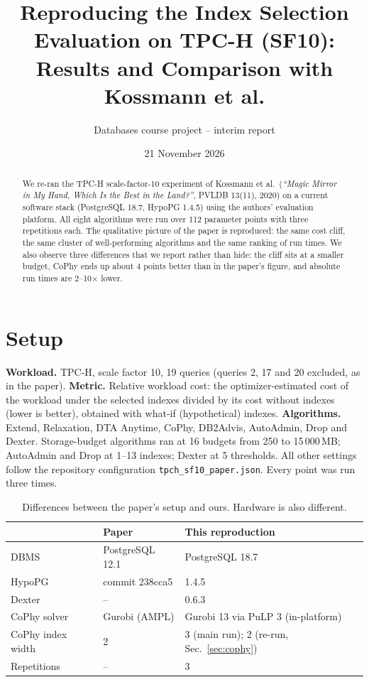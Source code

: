 \documentclass[11pt,a4paper]{article}
\title{Reproducing the Index Selection Evaluation on TPC-H (SF10):\\ Results and Comparison with Kossmann et al.}
\author{Databases course project -- interim report}
\date{21 November 2026}
\begin{document}
\maketitle

\begin{abstract}
We re-ran the TPC-H scale-factor-10 experiment of Kossmann et al.\ (\emph{``Magic Mirror in My Hand, Which Is the Best in the Land?''}, PVLDB 13(11), 2020) on a current software stack (PostgreSQL 18.7, HypoPG 1.4.5) using the authors' evaluation platform. All eight algorithms were run over 112 parameter points with three repetitions each. The qualitative picture of the paper is reproduced: the same cost cliff, the same cluster of well-performing algorithms and the same ranking of run times. We also observe three differences that we report rather than hide: the cliff sits at a smaller budget, CoPhy ends up about 4 points better than in the paper's figure, and absolute run times are 2--10$\times$ lower.
\end{abstract}

\section{Setup}
\textbf{Workload.} TPC-H, scale factor 10, 19 queries (queries 2, 17 and 20 excluded, as in the paper). \textbf{Metric.} Relative workload cost: the optimizer-estimated cost of the workload under the selected indexes divided by its cost without indexes (lower is better), obtained with what-if (hypothetical) indexes. \textbf{Algorithms.} Extend, Relaxation, DTA Anytime, CoPhy, DB2Advis, AutoAdmin, Drop and Dexter. Storage-budget algorithms ran at 16 budgets from 250 to 15\,000\,MB; AutoAdmin and Drop at 1--13 indexes; Dexter at 5 thresholds. All other settings follow the repository configuration \texttt{tpch\_sf10\_paper.json}. Every point was run three times.

\begin{table}[h]\centering\small
\begin{tabular}{lll}\toprule
 & Paper & This reproduction\\\midrule
DBMS & PostgreSQL 12.1 & PostgreSQL 18.7\\
HypoPG & commit 238cca5 & 1.4.5\\
Dexter & -- & 0.6.3\\
CoPhy solver & Gurobi (AMPL) & Gurobi 13 via PuLP 3 (in-platform)\\
CoPhy index width & 2 & 3 (main run); 2 (re-run, Sec.~\ref{sec:cophy})\\
Repetitions & -- & 3\\\bottomrule
\end{tabular}
\caption{Differences between the paper's setup and ours. Hardware is also different.}
\end{table}
\end{document}
